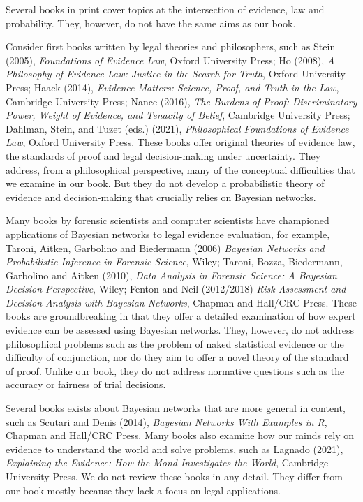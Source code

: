 \documentclass[
  10pt,
  dvipsnames,enabledeprecatedfontcommands]{scrartcl}
\begin{document}
\normalsize

Several books in print cover topics at the intersection of evidence, law
and probability. They, however, do not have the same aims as our book.

Consider first books written by legal theories and philosophers, such as
Stein (2005), \textit{Foundations of Evidence Law}, Oxford University
Press; Ho (2008),
\textit{A Philosophy of Evidence Law: Justice in the Search for Truth},
Oxford University Press; Haack (2014),
\textit{Evidence Matters: Science, Proof, and Truth in the Law},
Cambridge University Press; Nance (2016),
\textit{The Burdens of Proof: Discriminatory Power, Weight of Evidence, and Tenacity of Belief},
Cambridge University Press; Dahlman, Stein, and Tuzet (eds.) (2021),
\textit{Philosophical Foundations of Evidence Law}, Oxford University
Press. These books offer original theories of evidence law, the
standards of proof and legal decision-making under uncertainty. They
address, from a philosophical perspective, many of the conceptual
difficulties that we examine in our book. But they do not develop a
probabilistic theory of evidence and decision-making that crucially
relies on Bayesian networks.

Many books by forensic scientists and computer scientists have
championed applications of Bayesian networks to legal evidence
evaluation, for example, Taroni, Aitken, Garbolino and Biedermann (2006)
\textit{Bayesian Networks and Probabilistic Inference in Forensic Science},
Wiley; Taroni, Bozza, Biedermann, Garbolino and Aitken (2010),
\textit{Data Analysis in Forensic Science: A Bayesian Decision Perspective},
Wiley; Fenton and Neil (2012/2018)
\textit{Risk Assessment and Decision Analysis with Bayesian Networks},
Chapman and Hall/CRC Press. These books are groundbreaking in that they
offer a detailed examination of how expert evidence can be assessed
using Bayesian networks. They, however, do not address philosophical
problems such as the problem of naked statistical evidence or the
difficulty of conjunction, nor do they aim to offer a novel theory of
the standard of proof. Unlike our book, they do not address normative
questions such as the accuracy or fairness of trial decisions.

Several books exists about Bayesian networks that are more general in
content, such as Scutari and Denis (2014),
\textit{Bayesian Networks With Examples in R}, Chapman and Hall/CRC
Press. Many books also examine how our minds rely on evidence to
understand the world and solve problems, such as Lagnado (2021),
\textit{Explaining the Evidence: How the Mond Investigates the World},
Cambridge University Press. We do not review these books in any detail.
They differ from our book mostly because they lack a focus on legal
applications.
\end{document}
